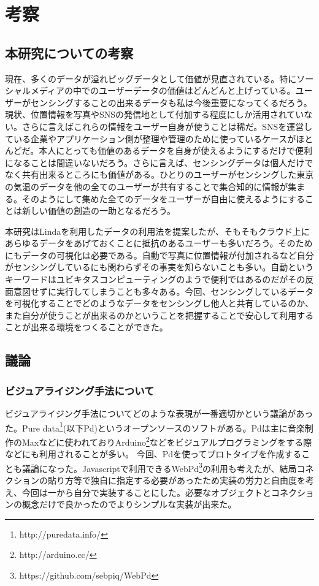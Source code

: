 \chapter{考察}
\label{chap:consideration}

\section{本研究についての考察}
現在、多くのデータが溢れビッグデータとして価値が見直されている。特にソーシャルメディアの中でのユーザーデータの価値はどんどんと上げっている。ユーザーがセンシングすることの出来るデータも私は今後重要になってくるだろう。現状、位置情報を写真やSNSの発信地として付加する程度にしか活用されていない。さらに言えばこれらの情報をユーザー自身が使うことは稀だ。SNSを運営している企業やアプリケーション側が整理や管理のために使っているケースがほとんどだ。本人にとっても価値のあるデータを自身が使えるようにするだけで便利になることは間違いないだろう。さらに言えば、センシングデータは個人だけでなく共有出来るところにも価値がある。ひとりのユーザーがセンシングした東京の気温のデータを他の全てのユーザーが共有することで集合知的に情報が集まる。そのようにして集めた全てのデータをユーザーが自由に使えるようにすることは新しい価値の創造の一助となるだろう。

本研究はLindaを利用したデータの利用法を提案したが、そもそもクラウド上にあらゆるデータをあげておくことに抵抗のあるユーザーも多いだろう。そのためにもデータの可視化は必要である。自動で写真に位置情報が付加されるなど自分がセンシングしているにも関わらずその事実を知らないことも多い。自動というキーワードはユビキタスコンピューティングのようで便利ではあるのだがその反面意図せずに実行してしまうことも多々ある。今回、センシングしているデータを可視化することでどのようなデータをセンシングし他人と共有しているのか、また自分が使うことが出来るのかということを把握することで安心して利用することが出来る環境をつくることができた。

\section{議論}
\subsection{ビジュアライジング手法について}
ビジュアライジング手法についてどのような表現が一番適切かという議論があった。Pure data\footnote{http://puredata.info/}(以下Pd)というオープンソースのソフトがある。Pdは主に音楽制作のMaxなどに使われておりArduino\footnote{http://arduino.cc/}などをビジュアルプログラミングをする際などにも利用されることが多い。
今回、Pdを使ってプロトタイプを作成することも議論になった。Javascriptで利用できるWebPd\footnote{https://github.com/sebpiq/WebPd}の利用も考えたが、結局コネクションの貼り方等で独自に指定する必要があったため実装の労力と自由度を考え、今回は一から自分で実装することにした。必要なオブジェクトとコネクションの概念だけで良かったのでよりシンプルな実装が出来た。

